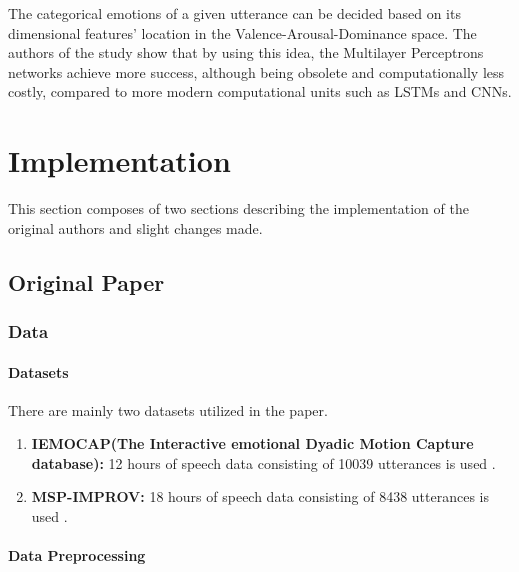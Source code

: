 \documentclass[a4paper,11pt]{article}
\begin{document}
The categorical emotions of a given utterance can be decided based on its dimensional features' location in the Valence-Arousal-Dominance space. The authors of the study show that by using this idea, the Multilayer Perceptrons networks achieve more success, although being obsolete and computationally less costly, compared to more modern computational units such as LSTMs and CNNs.

\pagebreak

\section{Implementation} \label{sec:implementation}

This section composes of two sections describing the implementation of the original authors and slight changes made.

\subsection{Original Paper}
\subsubsection{Data} 

\paragraph{Datasets}

There are mainly two datasets utilized in the paper. 
\begin{enumerate}
    \item \textbf{IEMOCAP(The Interactive emotional Dyadic Motion Capture database):} 12 hours of speech data consisting of 10039 utterances  is used \cite{busso2008iemocap}.
    \item \textbf{MSP-IMPROV:} 18 hours of speech data consisting of 8438 utterances is used \cite{busso2016msp}.
\end{enumerate}

\paragraph{Data Preprocessing} \label{subsec:datapreprocess}
\end{document}
